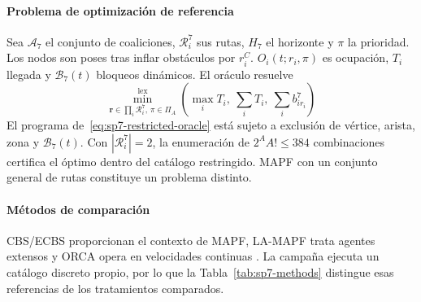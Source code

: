 \paragraph{Problema de optimización de referencia}

Sea $\mathcal A_7$ el conjunto de coaliciones, $\mathcal R_i^7$ sus rutas, $H_7$ el horizonte y $\pi$ la prioridad. Los nodos son poses tras inflar obstáculos por $r_i^C$. $O_i(t;r_i,\pi)$ es ocupación, $T_i$ llegada y $\mathcal B_7(t)$ bloqueos dinámicos. El oráculo resuelve
\begin{equation}
\label{eq:sp7-restricted-oracle}
 \min_{\boldsymbol r\in\prod_i\mathcal R_i^7,\,\pi\in\Pi_A}^{\mathrm{lex}}
 \left(\max_iT_i,\ \sum_iT_i,\ \sum_i b_{ir_i}^7\right)
\end{equation}
El programa de~\eqref{eq:sp7-restricted-oracle} está sujeto a exclusión de vértice, arista, zona y $\mathcal B_7(t)$. Con $|\mathcal R_i^7|=2$, la enumeración de $2^AA!\leq384$ combinaciones certifica el óptimo dentro del catálogo restringido. MAPF con un conjunto general de rutas constituye un problema distinto.

\paragraph{Métodos de comparación}

CBS/ECBS proporcionan el contexto de MAPF, LA-MAPF trata agentes extensos y ORCA opera en velocidades continuas \parencite{sharon2015cbs,barer2014ecbs,li2019largeAgentMapf,vandenberg2011orca}. La campaña ejecuta un catálogo discreto propio, por lo que la Tabla~\ref{tab:sp7-methods} distingue esas referencias de los tratamientos comparados.

